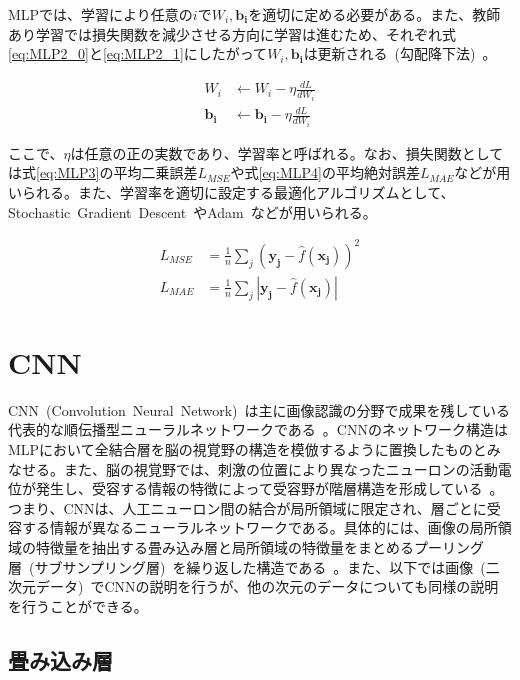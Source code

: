 
MLPでは、学習により任意の$i$で$W_i,\boldsymbol{b_i}$を適切に定める必要がある。また、教師あり学習では損失関数を減少させる方向に学習は進むため、それぞれ式\ref{eq:MLP2_0}と\ref{eq:MLP2_1}にしたがって$W_i,\boldsymbol{b_i}$は更新される~(勾配降下法)~。

\begin{align}
    \label{eq:MLP2_0}
    W _i &\leftarrow W_i - \eta \frac{d L}{dW_i} \\
    \label{eq:MLP2_1}
    \boldsymbol{b _i} &\leftarrow \boldsymbol{b_i} - \eta \frac{d L}{dW_i}
\end{align}

ここで、$\eta$は任意の正の実数であり、学習率と呼ばれる。なお、損失関数としては式\ref{eq:MLP3}の平均二乗誤差$L_{MSE}$や式\ref{eq:MLP4}の平均絶対誤差$L_{MAE}$などが用いられる。また、学習率を適切に設定する最適化アルゴリズムとして、Stochastic~Gradient~Descent~\cite{SGD}やAdam~\cite{Adam}などが用いられる。

\begin{align}
    \label{eq:MLP3}
    L_{MSE}&=\frac{1}{n}\sum _{j} {(\boldsymbol{y_j} - \hat{f}(\boldsymbol{x_j}))^2}\\
    \label{eq:MLP4}
    L_{MAE}&=\frac{1}{n}\sum _{j} {|\boldsymbol{y_j} - \hat{f}(\boldsymbol{x_j})|}
\end{align}

\section{CNN}


CNN~(Convolution~Neural~Network)~は主に画像認識の分野で成果を残している代表的な順伝播型ニューラルネットワークである~\cite{AlexNet}。CNNのネットワーク構造はMLPにおいて全結合層を脳の視覚野の構造を模倣するように置換したものとみなせる。また、脳の視覚野では、刺激の位置により異なったニューロンの活動電位が発生し、受容する情報の特徴によって受容野が階層構造を形成している~\cite{neocognition}。つまり、CNNは、人工ニューロン間の結合が局所領域に限定され、層ごとに受容する情報が異なるニューラルネットワークである。具体的には、画像の局所領域の特徴量を抽出する畳み込み層と局所領域の特徴量をまとめるプーリング層~(サブサンプリング層)~を繰り返した構造である~\cite{CNNsurvey}。また、以下では画像~(二次元データ)~でCNNの説明を行うが、他の次元のデータについても同様の説明を行うことができる。

\subsection{畳み込み層}

